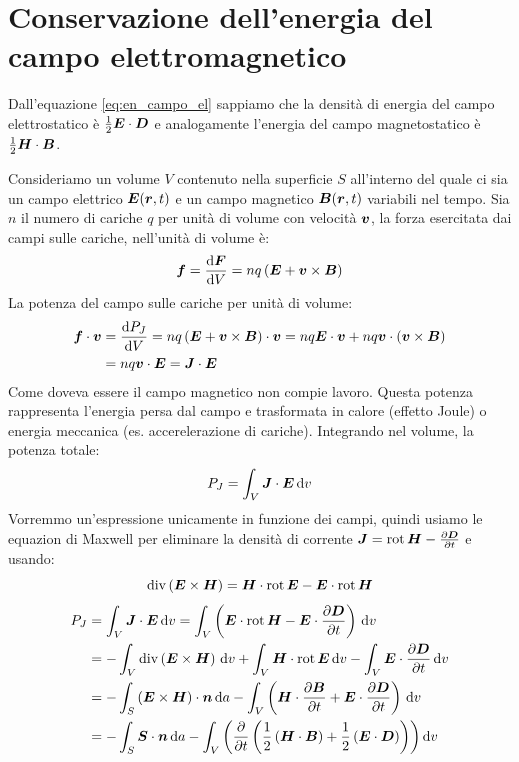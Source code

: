 \section{Conservazione dell'energia del campo elettromagnetico}

Dall'equazione \eqref{eq:en_campo_el} sappiamo che la densità di energia del campo elettrostatico è $\frac{1}{2}\boldsymbol{E}\cdot\boldsymbol{D}$ e analogamente l'energia del campo magnetostatico è \(\frac{1}{2}\boldsymbol{H}\cdot\boldsymbol{B}\).

Consideriamo un volume $V$ contenuto nella superficie $S$ all'interno del quale ci sia un campo elettrico $\boldsymbol{E}(\boldsymbol{r},t)$ e un campo magnetico $\boldsymbol{B}(\boldsymbol{r},t)$ variabili nel tempo. Sia $n$ il numero di cariche $q$ per unità di volume con velocità $\boldsymbol{v}$, la forza esercitata dai campi sulle cariche, nell'unità di volume è:
\begin{equation}
  \boldsymbol{f}=\frac{\mathrm{d}\boldsymbol{F}}{\mathrm{d} V}=nq\left(\boldsymbol{E}+\boldsymbol{v}\times\boldsymbol{B}\right)
\end{equation}
La potenza del campo sulle cariche per unità di volume:
\begin{equation}
  \begin{split}
    \boldsymbol{f}\cdot\boldsymbol{v}&=\frac{\mathrm{d} P_J}{\mathrm{d} V}=nq\left(\boldsymbol{E}+\boldsymbol{v}\times\boldsymbol{B}\right)\cdot\boldsymbol{v}=nq\boldsymbol{E}\cdot\boldsymbol{v}+nq\boldsymbol{v}\cdot\left(\boldsymbol{v}\times\boldsymbol{B}\right)\\
    &=nq\boldsymbol{v}\cdot\boldsymbol{E}=\boldsymbol{J}\cdot\boldsymbol{E}
  \end{split}
\end{equation}
Come doveva essere il campo magnetico non compie lavoro. Questa potenza rappresenta l'energia persa dal campo e trasformata in calore (effetto Joule) o energia meccanica (es. accerelerazione di cariche). Integrando nel volume, la potenza totale:
\begin{equation}
  P_J=\int_V\boldsymbol{J}\cdot\boldsymbol{E}\,\mathrm{d} v
\end{equation}
Vorremmo un'espressione unicamente in funzione dei campi, quindi usiamo le equazion di Maxwell per eliminare la densità di corrente $\boldsymbol{J}=\operatorname{rot}\boldsymbol{H}-\frac{\partial\boldsymbol{D}}{\partial t}$ e usando:
\[
  \operatorname{div}\left(\boldsymbol{E}\times\boldsymbol{H}\right)=\boldsymbol{H}\cdot\operatorname{rot}\boldsymbol{E}-\boldsymbol{E}\cdot\operatorname{rot}\boldsymbol{H}
\]
\begin{equation}
  \begin{split}
    P_J&=\int_V\boldsymbol{J}\cdot\boldsymbol{E}\,\mathrm{d} v=\int_V\left(\boldsymbol{E}\cdot\operatorname{rot}\boldsymbol{H}-\boldsymbol{E}\cdot\frac{\partial\boldsymbol{D}}{\partial t}\right)\,\mathrm{d} v\\
    &=-\int_V\operatorname{div}\left(\boldsymbol{E}\times\boldsymbol{H}\right)\,\mathrm{d} v+\int_V\boldsymbol{H}\cdot\operatorname{rot}\boldsymbol{E}\,\mathrm{d} v-\int_V\boldsymbol{E}\cdot\frac{\partial\boldsymbol{D}}{\partial t}\,\mathrm{d} v\\
    &=-\int_S\left(\boldsymbol{E}\times\boldsymbol{H}\right)\cdot\boldsymbol{n}\,\mathrm{d} a-\int_V\left(\boldsymbol{H}\cdot\frac{\partial\boldsymbol{B}}{\partial t}+\boldsymbol{E}\cdot\frac{\partial\boldsymbol{D}}{\partial t}\right)\,\mathrm{d} v\\
    &=-\int_S \boldsymbol{S}\cdot\boldsymbol{n}\,\mathrm{d} a-\int_V\left(\frac{\partial}{\partial t}\left(\frac{1}{2}\left(\boldsymbol{H}\cdot\boldsymbol{B}\right)+\frac{1}{2}\left(\boldsymbol{E}\cdot\boldsymbol{D}\right)\right)\right)\mathrm{d} v
  \end{split}
\end{equation}

